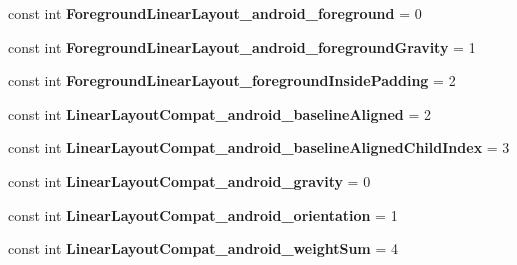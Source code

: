 \begin{DoxyCompactItemize}
\mbox{\label{class_pinned_app_1_1_droid_1_1_resource_1_1_styleable_a8a91135d6ef4d3f35eafe34f3fb6fea1}} 
const int {\bfseries Foreground\+Linear\+Layout\+\_\+android\+\_\+foreground} = 0
\item 
\mbox{\label{class_pinned_app_1_1_droid_1_1_resource_1_1_styleable_ae450e3aae754970e2610d7d84f0de8a1}} 
const int {\bfseries Foreground\+Linear\+Layout\+\_\+android\+\_\+foreground\+Gravity} = 1
\item 
\mbox{\label{class_pinned_app_1_1_droid_1_1_resource_1_1_styleable_ade552cf8128edfeed883832eb002eff8}} 
const int {\bfseries Foreground\+Linear\+Layout\+\_\+foreground\+Inside\+Padding} = 2
\item 
\mbox{\label{class_pinned_app_1_1_droid_1_1_resource_1_1_styleable_ac3009cc806400a3b3644d1077a93a496}} 
const int {\bfseries Linear\+Layout\+Compat\+\_\+android\+\_\+baseline\+Aligned} = 2
\item 
\mbox{\label{class_pinned_app_1_1_droid_1_1_resource_1_1_styleable_a9968280c7f6a4699cab9a1b84918237c}} 
const int {\bfseries Linear\+Layout\+Compat\+\_\+android\+\_\+baseline\+Aligned\+Child\+Index} = 3
\item 
\mbox{\label{class_pinned_app_1_1_droid_1_1_resource_1_1_styleable_a9fd9233ee54bf3b68ae7781f8c2b2e84}} 
const int {\bfseries Linear\+Layout\+Compat\+\_\+android\+\_\+gravity} = 0
\item 
\mbox{\label{class_pinned_app_1_1_droid_1_1_resource_1_1_styleable_a961476863940b820d117e6782b9a6355}} 
const int {\bfseries Linear\+Layout\+Compat\+\_\+android\+\_\+orientation} = 1
\item 
\mbox{\label{class_pinned_app_1_1_droid_1_1_resource_1_1_styleable_a9b082d93f7467afe560fbb08a604e2e3}} 
const int {\bfseries Linear\+Layout\+Compat\+\_\+android\+\_\+weight\+Sum} = 4

\end{DoxyCompactItemize}
